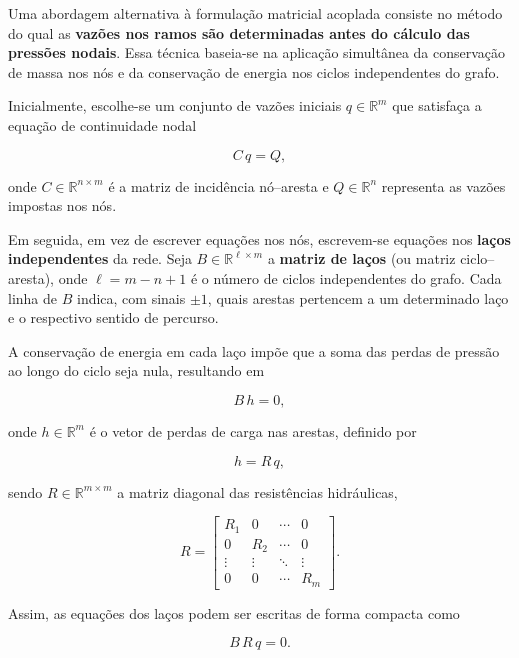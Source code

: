 \documentclass{article}
\begin{document}
Uma abordagem alternativa à formulação matricial acoplada consiste no método do qual as \textbf{vazões nos ramos são determinadas
antes do cálculo das pressões nodais}. Essa técnica baseia-se na aplicação simultânea da conservação de massa nos nós e da conservação de energia nos ciclos independentes do grafo.

Inicialmente, escolhe-se um conjunto de vazões iniciais $q \in \mathbb{R}^m$
que satisfaça a equação de continuidade nodal

\begin{equation}
C\,q = Q,
\end{equation}

onde $C \in \mathbb{R}^{n \times m}$ é a matriz de incidência nó--aresta
e $Q \in \mathbb{R}^n$ representa as vazões impostas nos nós.

Em seguida, em vez de escrever equações nos nós, escrevem-se equações
nos \textbf{laços independentes} da rede. Seja $B \in \mathbb{R}^{\ell \times m}$
a \textbf{matriz de laços} (ou matriz ciclo--aresta), onde $\ell = m-n+1$
é o número de ciclos independentes do grafo. Cada linha de $B$ indica,
com sinais $\pm 1$, quais arestas pertencem a um determinado laço e
o respectivo sentido de percurso.

A conservação de energia em cada laço impõe que a soma das perdas de
pressão ao longo do ciclo seja nula, resultando em

\begin{equation}
B\,h = 0,
\end{equation}

onde $h \in \mathbb{R}^m$ é o vetor de perdas de carga nas arestas,
definido por

\begin{equation}
h = R\,q,
\end{equation}

sendo $R \in \mathbb{R}^{m \times m}$ a matriz diagonal das resistências
hidráulicas,

\[
R =
\begin{bmatrix}
R_1 & 0 & \cdots & 0 \\
0 & R_2 & \cdots & 0 \\
\vdots & \vdots & \ddots & \vdots \\
0 & 0 & \cdots & R_m
\end{bmatrix}.
\]

Assim, as equações dos laços podem ser escritas de forma compacta como

\begin{equation}
B\,R\,q = 0.
\end{equation}
\end{document}
